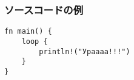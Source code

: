 \begin{frame}[fragile]
    \frametitle{ソースコードの例}

    \begin{lstlisting}[caption={Исходный код}]
fn main() {
    loop {
        println!("Ураааа!!!")
    }
}
    \end{lstlisting}
\end{frame}
